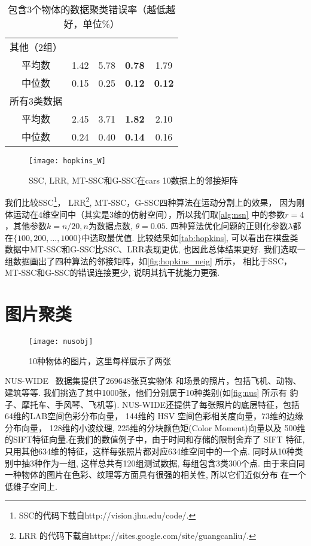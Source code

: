 \begin{table}[!htb]
\begin{tabular}{|c|c|c|c|c|}
	其他（2组）  &      &      &               &               \\
	平均数     & 1.42 & 5.78 & \textbf{0.78} & 1.79          \\
	中位数     & 0.15 & 0.25 & \textbf{0.12} & \textbf{0.12} \\ \hline
	所有3类数据  &      &      &               &               \\
	平均数     & 2.45 & 3.71 & \textbf{1.82} & 2.10 \\
    中位数     & 0.24 & 0.40 & \textbf{0.14}  & 0.16  \\ \hline
  \end{tabular}
  \caption{包含3个物体的数据聚类错误率（越低越好，单位\%）}
  \label{tab:hopkins}
\end{table}

\begin{figure}[tb]
  \centering
  \texttt{[image: hopkins\_W]}
  \caption{SSC, LRR, MT-SSC和G-SSC在cars 10数据上的邻接矩阵}
  \label{fig:hopkins_neig}
\end{figure}
我们比较SSC\footnote{SSC的代码下载自http://vision.jhu.edu/code/.}，
LRR\footnote{LRR 的代码下载自https://sites.google.com/site/guangcanliu/.},
MT-SSC，G-SSC四种算法在运动分割上的效果，
因为刚体运动在4维空间中（其实是3维的仿射空间），所以我们取\autoref{alg:nsn}
中的参数\(r=4\)，其他参数\(k=n/20, n\)为数据点数, \(\theta=0.05\).
四种算法优化问题的正则化参数\(\lambda\)都在\(\{100, 200, \ldots, 1000\}\)中选取最优值.
比较结果如\autoref{tab:hopkins}, 可以看出在棋盘类数据中MT-SSC和G-SSC比SSC、LRR表现更优,
也因此总体结果更好.
我们选取一组数据画出了四种算法的邻接矩阵，如\autoref{fig:hopkins_neig} 所示，
相比于SSC，MT-SSC和G-SSC的错误连接更少, 说明其抗干扰能力更强.

\section{图片聚类}
\begin{figure}[htb]
  \centering
  \texttt{[image: nusobj]}
  \caption{10种物体的图片，这里每样展示了两张}
  \label{fig:nus}
\end{figure}

NUS-WIDE~\cite{chua2009NUS} 数据集提供了269648张真实物体
和场景的照片，包括飞机、动物、建筑等等.
我们挑选了其中1000张，他们分别属于10种类别(如\autoref{fig:nus} 所示有
豹子、摩托车、手风琴、飞机等).
NUS-WIDE还提供了每张照片的底层特征，包括64维的LAB空间色彩分布向量，
144维的 HSV 空间色彩相关度向量，73维的边缘分布向量，
128维的小波纹理, 225维的分块颜色矩(Color Moment)向量以及
500维的SIFT特征向量.在我们的数值例子中，由于时间和存储的限制舍弃了
SIFT 特征, 只用其他634维的特征，这样每张照片都对应634维空间中的一个点.
同时从10种类别中抽3种作为一组, 这样总共有120组测试数据, 每组包含3类300个点.
由于来自同一种物体的图片在色彩、纹理等方面具有很强的相关性, 所以它们近似分布
在一个低维子空间上.

